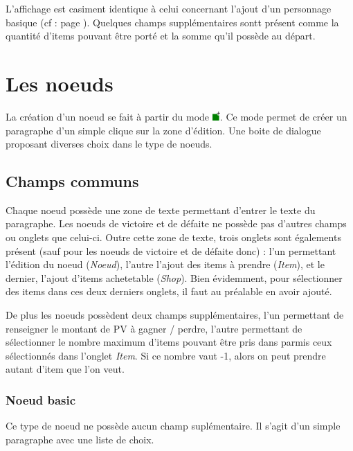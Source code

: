 			L'affichage est casiment identique à celui concernant l'ajout d'un personnage basique (cf :  page \pageref{sec:perso}). Quelques champs supplémentaires sontt présent comme la quantité d'items pouvant être porté et la somme qu'il possède au départ.

	\section{Les noeuds}

		\label{sec:noeuds}
		La création d'un noeud se fait à partir du mode \includegraphics[height=10pt, keepaspectratio]{img/icons/add_node.png}. Ce mode permet de créer un paragraphe d'un simple clique sur la zone d'édition. Une boite de dialogue proposant diverses choix dans le type de noeuds.

		\subsection{Champs communs}

			Chaque noeud possède une zone de texte permettant d'entrer le texte du paragraphe. Les noeuds de victoire et de défaite ne possède pas d'autres champs ou onglets que celui-ci. Outre cette zone de texte, trois onglets sont égalements présent (sauf pour les noeuds de victoire et de défaite donc) : l'un permettant l'édition du noeud (\textit{Noeud}), l'autre l'ajout des items à prendre (\textit{Item}), et le dernier, l'ajout d'items achetetable (\textit{Shop}). Bien évidemment, pour sélectionner des items dans ces deux derniers onglets, il faut au préalable en avoir ajouté.

			De plus les noeuds possèdent deux champs supplémentaires, l'un permettant de renseigner le montant de PV à gagner / perdre, l'autre permettant de sélectionner le nombre maximum d'items pouvant être pris dans parmis ceux sélectionnés dans l'onglet \textit{Item}. Si ce nombre vaut -1, alors on peut prendre autant d'item que l'on veut.

			\subsubsection{Noeud basic}

				Ce type de noeud ne possède aucun champ suplémentaire. Il s'agit d'un simple paragraphe avec une liste de choix.

